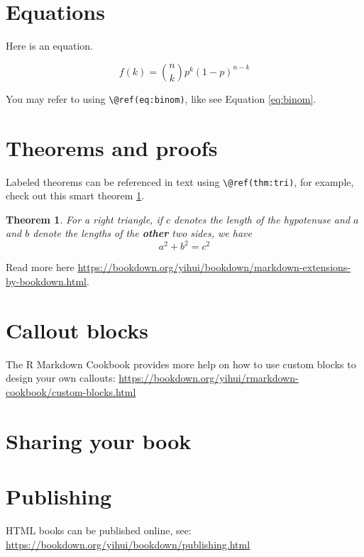 \documentclass[
]{book}
\newtheorem{theorem}{Theorem}[chapter]
\theoremstyle{definition}
\theoremstyle{definition}
\theoremstyle{definition}
\theoremstyle{definition}
\theoremstyle{remark}
\begin{document}
\section{Equations}\label{equations}

Here is an equation.

\begin{equation} 
  f\left(k\right) = \binom{n}{k} p^k\left(1-p\right)^{n-k}
  \label{eq:binom}
\end{equation}

You may refer to using \texttt{\textbackslash{}@ref(eq:binom)}, like see Equation \eqref{eq:binom}.

\section{Theorems and proofs}\label{theorems-and-proofs}

Labeled theorems can be referenced in text using \texttt{\textbackslash{}@ref(thm:tri)}, for example, check out this smart theorem \ref{thm:tri}.

\begin{theorem}
\protect\hypertarget{thm:tri}{}\label{thm:tri}For a right triangle, if \(c\) denotes the \emph{length} of the hypotenuse
and \(a\) and \(b\) denote the lengths of the \textbf{other} two sides, we have
\[a^2 + b^2 = c^2\]
\end{theorem}

Read more here \url{https://bookdown.org/yihui/bookdown/markdown-extensions-by-bookdown.html}.

\section{Callout blocks}\label{callout-blocks}

The R Markdown Cookbook provides more help on how to use custom blocks to design your own callouts: \url{https://bookdown.org/yihui/rmarkdown-cookbook/custom-blocks.html}

\section{Sharing your book}\label{sharing-your-book}

\section{Publishing}\label{publishing}

HTML books can be published online, see: \url{https://bookdown.org/yihui/bookdown/publishing.html}
\end{document}
